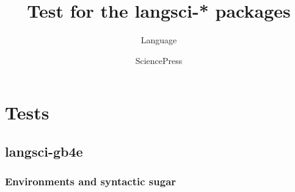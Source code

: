 \documentclass[output=book
	      ,nonflat
	      ,modfonts,
	      ,colorlinks
	      ,biblatex
	      ,showindex
	      ]{langsci/langscibook}
\title{Test for the langsci-* packages}
\author{Language\and Science\lastand Press}
\begin{document}
\maketitle 
\tableofcontents




\chapter{Tests} 
\section{langsci-gb4e}
\subsection{Environments and syntactic sugar}








\end{document}
